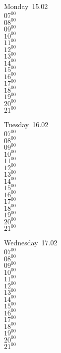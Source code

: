 \documentclass[11pt,a4paper]{book}\usepackage[]{graphicx}\usepackage[]{color}
\begin{document}
\begin{headerbox}
\end{headerbox}
\begin{weekdaybox}
  Monday~15.02\\
  { 
  \vfill
  $07^{00}$\\
$08^{00}$\\
$09^{00}$\\
$10^{00}$\\
$11^{00}$\\
$12^{00}$\\
$13^{00}$\\
$14^{00}$\\
$15^{00}$\\
$16^{00}$\\
$17^{00}$\\
$18^{00}$\\
$19^{00}$\\
$20^{00}$\\
$21^{00}$\\
  }
\end{weekdaybox}
\begin{weekdaybox}
  Tuesday~16.02\\
  { 
  \vfill
  $07^{00}$\\
$08^{00}$\\
$09^{00}$\\
$10^{00}$\\
$11^{00}$\\
$12^{00}$\\
$13^{00}$\\
$14^{00}$\\
$15^{00}$\\
$16^{00}$\\
$17^{00}$\\
$18^{00}$\\
$19^{00}$\\
$20^{00}$\\
$21^{00}$\\
  }
\end{weekdaybox}
\begin{weekdaybox}
  Wednesday~17.02\\
  { 
  \vfill
  $07^{00}$\\
$08^{00}$\\
$09^{00}$\\
$10^{00}$\\
$11^{00}$\\
$12^{00}$\\
$13^{00}$\\
$14^{00}$\\
$15^{00}$\\
$16^{00}$\\
$17^{00}$\\
$18^{00}$\\
$19^{00}$\\
$20^{00}$\\
$21^{00}$\\
  }
\end{weekdaybox}
\end{document}
